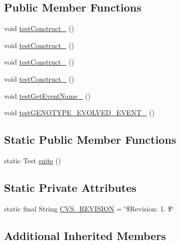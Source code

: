 \subsection*{Public Member Functions}
\begin{DoxyCompactItemize}
\item 
void \hyperlink{classorg_1_1jgap_1_1event_1_1_genetic_event_test_a7e181077791bc8bfe7a05306b1b73eaa}{test\-Construct\-\_} ()
\item 
void \hyperlink{classorg_1_1jgap_1_1event_1_1_genetic_event_test_a182f72bc02bdc01ccc8a932f3a7fc51f}{test\-Construct\-\_} ()
\item 
void \hyperlink{classorg_1_1jgap_1_1event_1_1_genetic_event_test_a502b1dbbca6274e49eb50ae75477c86d}{test\-Construct\-\_} ()
\item 
void \hyperlink{classorg_1_1jgap_1_1event_1_1_genetic_event_test_a9b6e27e3ecd463f4cc9d061fb39d76d1}{test\-Construct\-\_} ()
\item 
void \hyperlink{classorg_1_1jgap_1_1event_1_1_genetic_event_test_ab165b91109292551fe338f13f45b9d3f}{test\-Get\-Event\-Name\-\_} ()
\item 
void \hyperlink{classorg_1_1jgap_1_1event_1_1_genetic_event_test_a570ed0a855f0c2c45bf6e36816106ea0}{test\-G\-E\-N\-O\-T\-Y\-P\-E\-\_\-\-E\-V\-O\-L\-V\-E\-D\-\_\-\-E\-V\-E\-N\-T\-\_} ()
\end{DoxyCompactItemize}
\subsection*{Static Public Member Functions}
\begin{DoxyCompactItemize}
\item 
static Test \hyperlink{classorg_1_1jgap_1_1event_1_1_genetic_event_test_a33de35a237b309e5d87a2e55f9be06a5}{suite} ()
\end{DoxyCompactItemize}
\subsection*{Static Private Attributes}
\begin{DoxyCompactItemize}
\item 
static final String \hyperlink{classorg_1_1jgap_1_1event_1_1_genetic_event_test_acb42dca9601b0fb5b6430b1d4a5dd3ad}{C\-V\-S\-\_\-\-R\-E\-V\-I\-S\-I\-O\-N} = \char`\"{}\$Revision\-: 1. \$\char`\"{}
\end{DoxyCompactItemize}
\subsection*{Additional Inherited Members}


